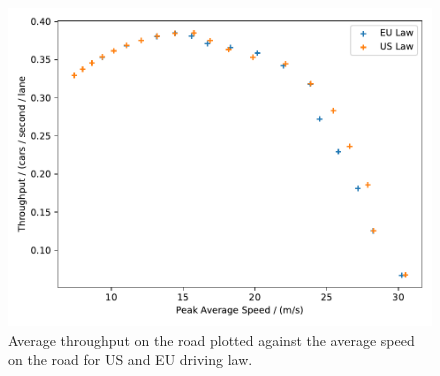 \begin{figure}[H]
	\centering
	\includegraphics[width=0.9\linewidth]{media/throughput_speed.pdf}
	\caption{Average throughput on the road plotted against the average speed on the road for US and EU driving law.}
	\label{fig:throughput-speed}
\end{figure}
